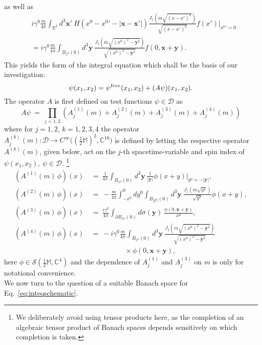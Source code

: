 \documentclass[b5paper,draft,openbib,12pt]{memoir}
\newcommand{\R}{\mathbb{R}}
\newcommand{\CC}{\mathbb{C}}
\newcommand{\M}{\mathbb{M}}
\newcommand{\vx}{\mathbf{x}}
\newcommand{\vy}{\mathbf{y}}
\newcommand{\free}{{\textup free}}
\begin{document}
as well as
\begin{align}
	&i \gamma^0\frac{m}{4\pi} \int_{\R^3}d^3 \vx' ~ H(x^0 - {x^0}' - |\vx-\vx'|) \frac{J_1(m\sqrt{(x-x')^2})}{\sqrt{(x-x')^2}} f(x')|_{{x^0}' = 0}\nonumber\\
&= i \gamma^0\frac{m}{4\pi} \int_{B_{x^0}(0)}d^3 \vy ~ \frac{J_1(m\sqrt{(x^0)^2 - \vy^2})}{\sqrt{(x^0)^2 - \vy^2}} f(0,\vx+\vy).
\end{align}
This yields the form of the integral equation which shall be the basis of our investigation:
\begin{equation}
	\psi(x_1,x_2) = \psi^\free(x_1,x_2) + (A \psi)(x_1,x_2).
\label{eq:inteqschematic}
\end{equation}
The operator $A$ is first defined on test functions $\psi \in \mathscr{D}$ as
\begin{equation}
	A\psi ~=~ \prod_{j=1,2} \left(A_j^{(1)}(m) + A_j^{(2)}(m) + A_j^{(3)}(m) + A_j^{(4)}(m)\right)
 \label{eq:defa}   
\end{equation}
where for $j=1,2$, $k=1,2,3,4$ the operator \\
\(A_j^{(k)}(m) : \mathscr{D} \rightarrow C^\infty\big((\frac{1}{2}\M)^2,\CC^{16}\big)\)  
is defined by letting the respective operator $A^{(k)}(m)$, given 
below, act on the $j$-th spacetime-variable and spin index of 
$\psi(x_1,x_2),~ \psi \in \mathscr{D}$.
\footnote{We deliberately avoid using tensor products here, as 
the completion of an algebraic tensor product of Banach spaces depends sensitively 
on which completion is taken.}
\begin{align}
	\left(A^{(1)}(m) \,\phi \right)(x) ~&=~ \frac{1}{4\pi} \int_{B_{x^0}(0)} \! \!d^3 \vy ~ \frac{1}{|\vy|} \phi(x+y)|_{y^0 = -|\vy|}, \label{eq:a1}\\
	\left(A^{(2)}(m) \,\phi\right)(x) ~&=~ -\frac{m}{4\pi} \int_{-x^0}^0 dy^0 \int_{B_{|y^0|}(0)} d^3 \vy ~ \frac{J_1(m\sqrt{y^2})}{\sqrt{y^2}} \phi(x+y),\label{eq:a2}\\
	\left(A^{(3)}(m)\, \phi\right)(x) ~&=~ \frac{i \gamma^0}{4\pi} \int_{\partial B_{x^0}(0)}d\sigma(\vy) ~ \frac{\phi(0,\vx+\vy)}{x^0}, \label{eq:a3}\\\nonumber
  \left(A^{(4)}(m) \, \phi\right)(x) ~&=~ - i \gamma^0 \frac{m}{4\pi} \int_{B_{x^0}(0)}d^3 \vy ~ \frac{J_1(m\sqrt{(x^0)^2 - \vy^2})}{\sqrt{(x^0)^2 - \vy^2}}\\
  &\hspace{2cm} \times\phi(0,\vx+\vy),\label{eq:a4}
\end{align}
here \(\phi\in\mathcal{S}(\frac{1}{2}\M,\mathbb{C}^4)\) and the dependence of $A_j^{(1)}$ and 
$A_j^{(3)}$ on $m$ is only for notational convenience.\\
We now turn to the question of a suitable Banach space for Eq.\ \eqref{eq:inteqschematic}.
\end{document}
